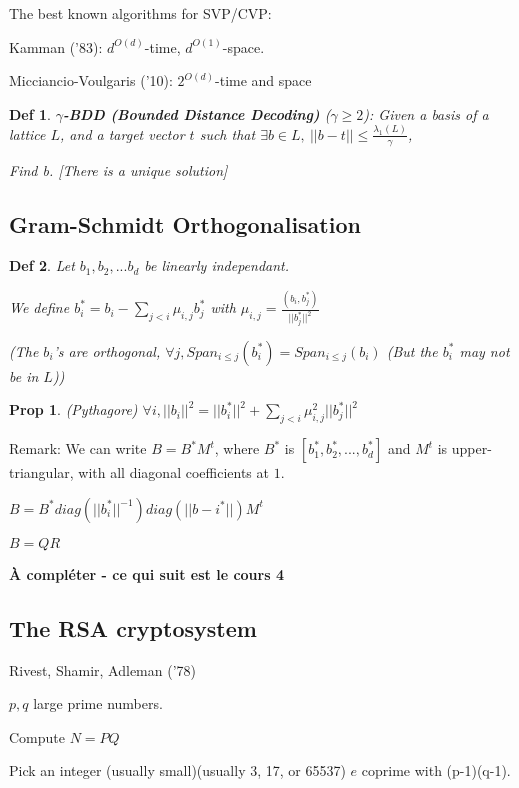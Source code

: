 \documentclass[11pt]{article}
\newtheorem{definition}{Def}
\newtheorem{proposition}{Prop}
\begin{document}
The best known algorithms for SVP/CVP:

Kamman ('83): $d^{O(d)}$-time, $d^{O(1)}$-space.

Micciancio-Voulgaris ('10): $2^{O(d)}$-time and space

\begin{definition}
\textbf{$\gamma$-BDD (Bounded Distance Decoding)} ($\gamma \geq 2$): Given a basis of a lattice $L$, and a target vector $t$ such that $\exists b \in L, \ ||b-t|| \leq \frac{\lambda_1(L)}{\gamma}$,

Find b.
[There is a unique solution]
\end{definition}

\subsection{Gram-Schmidt Orthogonalisation}

\begin{definition}
Let $b_1,b_2,...b_d$ be linearly independant.

We define $b_i^* = b_i - \sum_{j < i} \mu_{i,j} b_j^*$ with $\mu_{i,j} = \frac{(b_i,b_j^*)}{||b_j^*||^2}$

(The $b_i$'s are orthogonal, $\forall j, Span_{i \leq j}(b_i^*)=Span_{i \leq j}(b_i)$ (But the $b_i^*$ may not be in $L$))
\end{definition}

\begin{proposition}(Pythagore)
$\forall i, ||b_i||^2 = ||b_i^*||^2+\sum_{j<i} \mu_{i,j}^2 ||b_j^*||^2$
\end{proposition}

Remark: We can write $B= B^* M^t$, where $B^*$ is $[b_1^*,b_2^*,...,b_d^*]$ and $M^t$ is upper-triangular, with all diagonal coefficients at $1$.

$B = B^* diag(||b_i^*||^{-1}) diag(||b-i^*||) M^t$

$B= Q R$

\textbf{À compléter - ce qui suit est le cours 4}

\subsection{The RSA cryptosystem}

Rivest, Shamir, Adleman ('78)

$p, q$ large prime numbers.

Compute $N= P Q$

Pick an integer (usually small)(usually 3, 17, or 65537) $e$ coprime with (p-1)(q-1).
\end{document}
